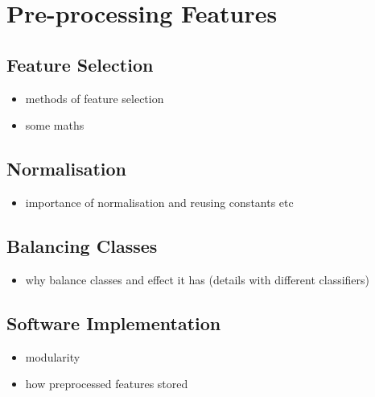 \section{Pre-processing Features}
\label{sec:pl-featpreproc}

    \subsection{Feature Selection}
    \label{subsec:pl-featpreproc-sel}
        \begin{itemize}
            \item{methods of feature selection}
            \item{some maths}
        \end{itemize}
        
    \subsection{Normalisation}
    \label{subsec:pl-featpreproc-norm}
        \begin{itemize}
            \item{importance of normalisation and reusing constants etc}
        \end{itemize}
    
    \subsection{Balancing Classes}
    \label{subsec:pl-featpreproc-bal}
        \begin{itemize}
            \item{why balance classes and effect it has (details with different classifiers)}
        \end{itemize}
    
    \subsection{Software Implementation}
    \label{subsec:pl-featpreproc-software}
        \begin{itemize}
            \item{modularity}
            \item{how preprocessed features stored}
        \end{itemize}
    